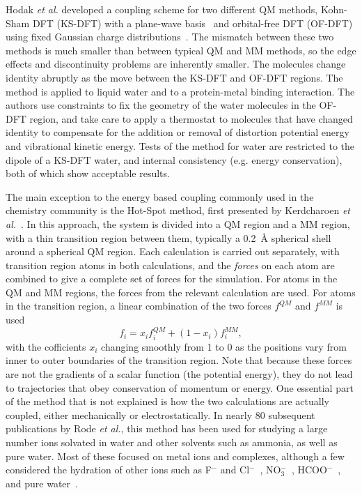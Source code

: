 \documentclass[11pt]{revtex4}
\begin{document}
Hodak {\it et al.} developed a coupling scheme for two different
QM methods, Kohn-Sham DFT (KS-DFT) with a plane-wave basis~\cite{kohn_phys_rev_1965a}
and orbital-free DFT (OF-DFT) using fixed Gaussian charge
distributions~\cite{hodak_j_chem_phys_2008a}.  The mismatch between
these two methods is much smaller than between typical QM and MM
methods, so the edge effects and discontinuity problems are inherently
smaller.  The molecules change identity abruptly as the move between
the KS-DFT and OF-DFT regions.  The method is applied to liquid
water and to a protein-metal binding interaction.  The authors use
constraints to fix the geometry of the water molecules in the OF-DFT
region, and take care to apply a thermostat to molecules that have
changed identity to compensate for the addition or removal of
distortion potential energy and vibrational kinetic energy.  Tests
of the method for water are restricted to the dipole of a KS-DFT
water, and internal consistency (e.g. energy conservation), both
of which show acceptable results.


The main exception to the energy based coupling commonly used in
the chemistry community is the Hot-Spot method, first presented by
Kerdcharoen {\it et al.}~\cite{kerdcharoen_chem_phys_1996a}.  In
this approach, the system is divided into a QM region and a MM
region, with a thin transition region between them, typically a
0.2~{\AA} spherical shell around a spherical QM region.  Each
calculation is carried out separately, with transition region atoms
in both calculations, and the {\em forces} on each atom are combined
to give a complete set of forces for the simulation.   For atoms
in the QM and MM regions, the forces from the relevant calculation are used.
For atoms in the transition region, a linear combination of the two
forces $f^{QM}$ and $f^{MM}$ is used
$$f_i = x_i f_i^{QM} + (1-x_i) f_i^{MM},$$
with the cofficients $x_i$ changing smoothly from 1 to 0
as the positions vary from inner to outer boundaries of the transition
region.  Note that because these forces are not the gradients of a scalar
function (the potential energy), they do not lead to trajectories that
obey conservation of momentum or energy.  One essential part of the method
that is not explained is how the two calculations are actually coupled,
either mechanically or electrostatically.  In
nearly 80 subsequent publications by Rode {\it et al.}, this method
has been used for studying a large number ions solvated in water
and other solvents such as ammonia, as well as pure water.  Most
of these focused on metal ions and complexes, although a few
considered the hydration of other ions such as F$^-$ and
Cl$^-$~\cite{tongraar_phys_chem_chem_phys_2003a,tongraar_chem_phys_lett_2005a},
NO$_3^-$~\cite{tongraar_j_phys_chem_a_2006a},
HCOO$^-$~\cite{payaka_j_phys_chem_a_2009a}, and pure
water~\cite{xenides_j_chem_phys_2005a,xenides_j_mol_liq_2006a}.
\end{document}
